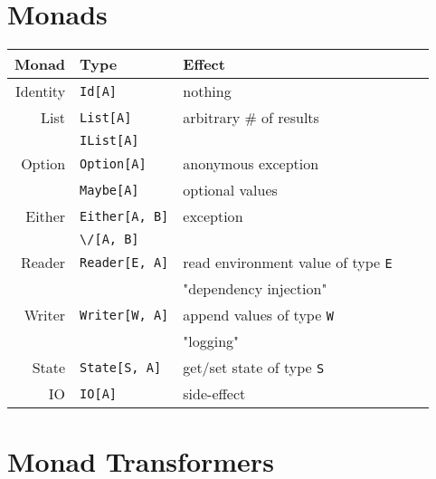 \documentclass{tufte-handout}
\begin{document}
\section{Monads}\label{sec:monads}

\begin{table}[ht]
  \centering
  \selectfont
  \begin{tabular}{rllll}
    Monad & Type & Effect\footnotemark[1] \\
    \midrule
    Identity & \texttt{Id[A]} & nothing \\
    List  & \texttt{List[A]}\footnotemark[2]          & arbitrary \# of results \\
    & \verb$IList[A]$ & \\
    Option & \texttt{Option[A]}\footnotemark[2]       & anonymous exception \\
    & \verb$Maybe[A]$ & optional values \\
    Either & \texttt{Either[A, B]}\footnotemark[2]        & exception \\
    & \verb$\/[A, B]$ & \\
    Reader & \texttt{Reader[E, A]}       & read environment value of type \verb$E$  \\
                 & & "dependency injection" \\
    Writer & \texttt{Writer[W, A]}        & append values of type \verb$W$ \\
              & & "logging" \\
    State & \texttt{State[S, A]}      & get/set state of type \verb$S$ \\
    IO  & \texttt{IO[A]}         & side-effect\footnotemark[3]  \\
  \end{tabular}
  \label{tab:normaltab}
\end{table}





\section{Monad Transformers}\label{sec:monadtrans}
\end{document}
